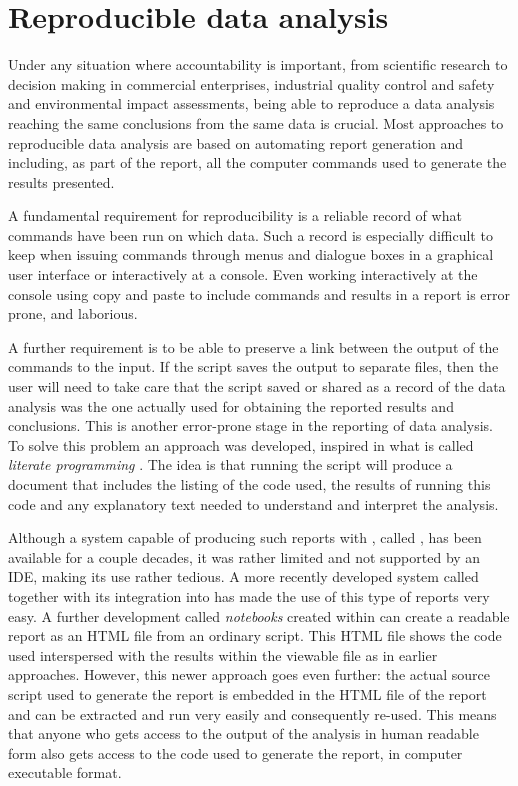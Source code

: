 \documentclass[krantz2]{krantz}\usepackage{knitr}
\begin{document}
\section{Reproducible data analysis}
Under any situation where accountability is important, from scientific research to decision making in commercial enterprises, industrial quality control and safety and environmental impact assessments, being able to reproduce a data analysis reaching the same conclusions from the same data is crucial. Most approaches to reproducible data analysis are based on automating report generation and including, as part of the report, all the computer commands used to generate the results presented.

A fundamental requirement for reproducibility is a reliable record of what commands have been run on which data. Such a record is especially difficult to keep when issuing commands through menus and dialogue boxes in a graphical user interface or interactively at a console. Even working interactively at the \Rpgrm console using copy and paste to include commands and results in a report is error prone, and laborious.

A further requirement is to be able to preserve a link between the output of the \Rlang commands to the input. If the script saves the output to separate files, then the user will need to take care that the script saved or shared as a record of the data analysis was the one actually used for obtaining the reported results and conclusions. This is another error-prone stage in the reporting of data analysis. To solve this problem an approach was developed, inspired in what is called \emph{literate programming} \autocite{Knuth1984a}. The idea is that running the script will produce a document that includes the listing of the \Rlang code used, the results of running this code and any explanatory text needed to understand and interpret the analysis.

Although a system capable of producing such reports with \Rlang, called  \autocite{Leisch2002}, has been available for a couple decades, it was rather limited and not supported by an IDE, making its use rather tedious. A more recently developed system called  \autocite{Xie2013} together with its integration into \RStudio has made the use of this type of reports very easy. A further development called \Rlang \emph{notebooks} created within \RStudio can create a readable report as an HTML file from an ordinary \Rlang script. This HTML file shows the code used interspersed with the results within the viewable file as in earlier approaches. However, this newer approach goes even further: the actual source script used to generate the report is embedded in the HTML file of the report and can be extracted and run very easily and consequently re-used. This means that anyone who gets access to the output of the analysis in human readable form also gets access to the code used to generate the report, in computer executable format.
\end{document}
